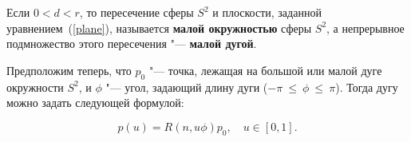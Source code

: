 \begin{definition}
Если $0<d<r$, то пересечение сферы $S^2$ и плоскости, заданной уравнением~(\ref{plane}), называется \textbf{малой
окружностью} сферы $S^2$, а непрерывное подмножество этого пересечения "--- \textbf{малой дугой}.
\end{definition}

Предположим теперь, что $p_0$ "--- точка, лежащая на большой или малой дуге окружности $S^2$, и $\phi$ "--- угол,
задающий длину дуги ($-\pi~\le~\phi~\le~\pi$). Тогда дугу можно задать следующей формулой:

$$
p(u)=R(n,u\phi)p_0, \quad u \in [0,1].
$$
